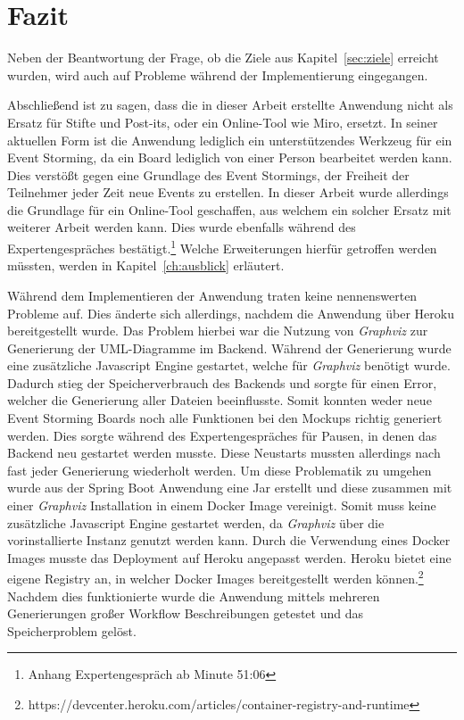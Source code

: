 \chapter{Fazit}\label{ch:fazit}
Neben der Beantwortung der Frage, ob die Ziele aus Kapitel~\ref{sec:ziele} erreicht wurden, wird auch auf Probleme während
der Implementierung eingegangen.


Abschließend ist zu sagen, dass die in dieser Arbeit erstellte Anwendung nicht als Ersatz für Stifte und Post-its, oder ein Online-Tool wie Miro, ersetzt.
In seiner aktuellen Form ist die Anwendung lediglich ein unterstützendes Werkzeug für ein Event Storming, da ein Board lediglich von einer Person bearbeitet werden kann.
Dies verstößt gegen eine Grundlage des Event Stormings, der Freiheit der Teilnehmer jeder Zeit neue Events zu erstellen.
In dieser Arbeit wurde allerdings die Grundlage für ein Online-Tool geschaffen, aus welchem ein solcher Ersatz mit weiterer Arbeit werden kann.
Dies wurde ebenfalls während des Expertengespräches bestätigt.\footnote{Anhang Expertengespräch ab Minute 51:06}
Welche Erweiterungen hierfür getroffen werden müssten, werden in Kapitel~\ref{ch:ausblick} erläutert.

Während dem Implementieren der Anwendung traten keine nennenswerten Probleme auf.
Dies änderte sich allerdings, nachdem die Anwendung über Heroku bereitgestellt wurde.
Das Problem hierbei war die Nutzung von \textit{Graphviz} zur Generierung der UML-Diagramme im Backend.
Während der Generierung wurde eine zusätzliche Javascript Engine gestartet, welche für \textit{Graphviz} benötigt wurde.
Dadurch stieg der Speicherverbrauch des Backends und sorgte für einen Error, welcher die Generierung aller Dateien beeinflusste.
Somit konnten weder neue Event Storming Boards noch alle Funktionen bei den Mockups richtig generiert werden.
Dies sorgte während des Expertengespräches für Pausen, in denen das Backend neu gestartet werden musste.
Diese Neustarts mussten allerdings nach fast jeder Generierung wiederholt werden.
Um diese Problematik zu umgehen wurde aus der Spring Boot Anwendung eine Jar erstellt und diese zusammen mit einer \textit{Graphviz} Installation in einem Docker Image
vereinigt.\cite*{size-problem}
Somit muss keine zusätzliche Javascript Engine gestartet werden, da \textit{Graphviz} über die vorinstallierte Instanz genutzt werden kann.
Durch die Verwendung eines Docker Images musste das Deployment auf Heroku angepasst werden.
Heroku bietet eine eigene Registry an, in welcher Docker Images bereitgestellt werden können.\footnote{https://devcenter.heroku.com/articles/container-registry-and-runtime}
Nachdem dies funktionierte wurde die Anwendung mittels mehreren Generierungen großer Workflow Beschreibungen getestet und das Speicherproblem gelöst.
